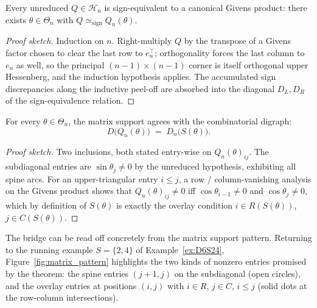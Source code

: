 \begin{theorem}[Universality]\label{thm:universality}
Every unreduced $Q \in \mathcal{H}_n$ is sign-equivalent to a canonical
Givens product: there exists $\theta \in \Theta_n$ with
$Q \simeq_{\mathrm{sign}} Q_n(\theta)$.
\end{theorem}

\begin{proof}[Proof sketch]
Induction on $n$. Right-multiply $Q$ by the transpose of a Givens factor
chosen to clear the last row to $e_n^\top$; orthogonality forces the last
column to $e_n$ as well, so the principal $(n{-}1) \times (n{-}1)$ corner
is itself orthogonal upper Hessenberg, and the induction hypothesis
applies. The accumulated sign discrepancies along the inductive peel-off
are absorbed into the diagonal $D_L, D_R$ of the sign-equivalence
relation.
\end{proof}

\begin{theorem}[Bridge]\label{thm:bridge}
For every $\theta \in \Theta_n$, the matrix support agrees with the
combinatorial digraph:
\[
  D\bigl(Q_n(\theta)\bigr) \;=\; D_n\bigl(S(\theta)\bigr).
\]
\end{theorem}

\begin{proof}[Proof sketch]
Two inclusions, both stated entry-wise on $Q_n(\theta)_{ij}$. The
subdiagonal entries are $\sin\theta_{j} \ne 0$ by the unreduced
hypothesis, exhibiting all spine arcs. For an upper-triangular entry
$i \le j$, a row / column-vanishing analysis on the Givens product shows
that $Q_n(\theta)_{ij} \ne 0$ iff $\cos\theta_{i-1} \ne 0$ and
$\cos\theta_{j} \ne 0$, which by definition of $S(\theta)$ is exactly the
overlay condition $i \in R(S(\theta))$, $j \in C(S(\theta))$.
\end{proof}

The bridge can be read off concretely from the matrix support pattern.
Returning to the running example $S = \{2, 4\}$ of
Example~\ref{ex:D6S24}, Figure~\ref{fig:matrix_pattern} highlights the
two kinds of nonzero entries promised by the theorem: the spine entries
$(j+1, j)$ on the subdiagonal (open circles), and the overlay entries at
positions $(i, j)$ with $i \in R$, $j \in C$, $i \le j$ (solid dots at
the row-column intersections).

